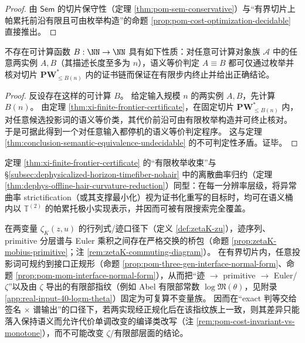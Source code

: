 \begin{proof}
由 \(\mathsf{Sem}\) 的切片保守性（定理 \ref{thm:pom-sem-conservative}）与“有界切片上帕累托前沿有限且可由枚举构造”的命题 \ref{prop:pom-cost-optimization-decidable} 直接推出。
\end{proof}

\begin{theorem}[切片枚举边界不存在可计算增长律]\label{thm:xi-no-computable-slice-bound-for-semantic-equivalence}
不存在可计算函数 \(B:\NN\to\NN\) 具有如下性质：对任意可计算对象族 \(\mathcal A\) 中的任意两实例 \(A,B\)（其描述长度至多为 \(n\)），语义等价判定 \(A\equiv B\) 都可仅通过枚举并核对切片 \(\mathbf{PW}^{\ast}_{\le B(n)}\) 内的证书链而保证在有限步内终止并给出正确结论。
\end{theorem}

\begin{proof}
反设存在这样的可计算 \(B\)。
给定输入规模 \(n\) 的两实例 \(A,B\)，先计算 \(B(n)\)。
由定理 \ref{thm:xi-finite-frontier-certificate}，在固定切片 \(\mathbf{PW}^{\ast}_{\le B(n)}\) 内，对任意候选投影词的语义等价类，其代价前沿可由有限枚举构造并可终止核对。
于是可据此得到一个对任意输入都停机的语义等价判定程序。
这与定理 \ref{thm:conclusion-semantic-equivalence-undecidable} 的不可判定性矛盾。证毕。
\end{proof}

定理 \ref{thm:xi-finite-frontier-certificate} 的“有限枚举收束”与 \S\ref{subsec:dephysicalized-horizon-timefiber-nohair} 中的离散曲率归约（定理 \ref{thm:dephys-offline-hair-curvature-reduction}）同型：在每一分辨率层级，将异常曲率 strictification（或其支撑最小化）视为证书化重写的目标时，均可在语义桶内以 \(\mathbb{T}^{(2)}\) 的帕累托极小实现表示，并因而可被有限搜索完全覆盖。

\begin{theorem}\label{thm:xi-zeta-interface-auditable-uniqueness}
在两变量 \(\zeta_K(z,u)\) 的行列式/迹口径下（定义 \ref{def:zetaK-zu}），迹序列、primitive 分层谱与 Euler 乘积之间存在严格交换的桥包（命题 \ref{prop:zetaK-mobius-primitive}；注 \ref{rem:zetaK-commuting-diagram}）。
在有界切片内，任意投影词可规约到接口正规形（命题 \ref{prop:pom-three-gen-interface-normal-form}、命题 \ref{prop:pom-mom-interface-normal-form}），从而把“迹 \(\to\) primitive \(\to\) Euler/\(\zeta\)”以及由 \(\zeta\) 导出的有限部指纹（例如 Abel 有限部常数 \(\log\mathfrak{M}(\theta)\)，见附录 \ref{app:real-input-40-logm-theta}）固定为可复算不变量族。
因而在“exact 判等交给签名 \(\times\) 谱输出”的口径下，若两实现经正规化后在该指纹族上一致，则其差异只能落入保持语义而允许代价单调改变的编译类改写（注 \ref{rem:pom-cost-invariant-vs-monotone}），而不可能改变 \(\zeta\)/有限部层面的结论。
\end{theorem}

